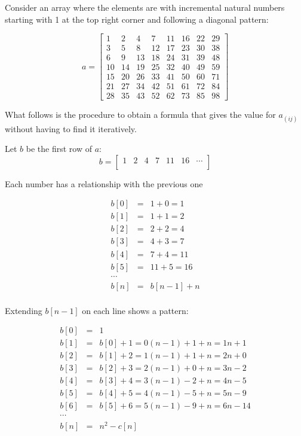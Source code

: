 \documentclass[12pt]{article}
\begin{document}
Consider an array where the elements are with incremental natural numbers starting with 1 at the top right corner and following a diagonal pattern:

\begin{equation}
    a = 
\begin{bmatrix}
    1 & 2 & 4 & 7 & 11 & 16 & 22 & 29 \\
    3 & 5 & 8 & 12 & 17 & 23 & 30 & 38\\
    6 & 9 & 13 & 18 & 24 & 31 & 39 & 48\\
    10 & 14 & 19 & 25 & 32 & 40 & 49 & 59\\
    15 & 20 & 26 & 33 & 41 & 50 & 60 & 71\\
    21 & 27 & 34 & 42 & 51 & 61 & 72 & 84\\
    28 & 35 & 43 & 52 & 62 & 73 & 85 & 98
\end{bmatrix}\nonumber
\end{equation}

What follows is the procedure to obtain a formula that gives the value for $a_(ij)$ without having to find it iteratively.

Let $b$ be the first row of $a$:
\begin{equation}
    b =
\begin{bmatrix}
    1 & 2 & 4 & 7 & 11 & 16 &\cdots\nonumber\\
\end{bmatrix}
\end{equation}

Each number has a relationship with the previous one

\begin{eqnarray*}
b[0] &=& 1 + 0 = 1\\
b[1] &=& 1 + 1 = 2\\
b[2] &=& 2 + 2 = 4\\
b[3] &=& 4 + 3 = 7\\
b[4] &=& 7 + 4 = 11\\
b[5] &=& 11 + 5 = 16\\
\cdots&\\
b[n] &=& b[n-1] + n\\
\end{eqnarray*}

Extending $b[n-1]$ on each line shows a pattern:

\begin{eqnarray}
b[0] &=& 1\nonumber\\
b[1] &=& b[0] + 1 = 0(n-1) + 1 + n = 1n + 1\nonumber\\
b[2] &=& b[1] + 2 = 1(n-1) + 1 + n = 2n + 0\nonumber\\
b[3] &=& b[2] + 3 = 2(n-1) + 0 + n = 3n - 2\nonumber\\
b[4] &=& b[3] + 4 = 3(n-1) - 2 + n = 4n - 5\nonumber\\
b[5] &=& b[4] + 5 = 4(n-1) - 5 + n = 5n - 9\nonumber\\
b[6] &=& b[5] + 6 = 5(n-1) - 9 + n = 6n - 14\nonumber\\
\cdots&\nonumber\\
b[n] &=& n^2 - c[n] \label{eq:b}
\end{eqnarray}
\end{document}
